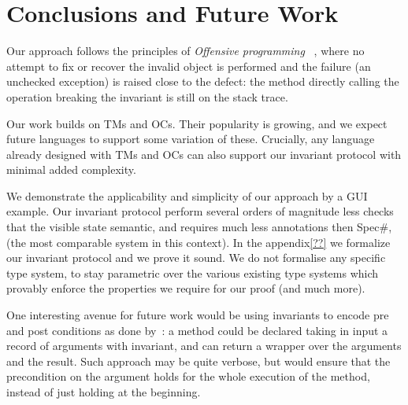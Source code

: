 \section{Conclusions and Future Work}
Our approach follows the principles of \emph{Offensive programming}
~\cite{stephens2015beginning}, where 
no attempt to fix or recover the invalid object is performed and
 the failure (an unchecked exception)
		is raised close to the defect: the method directly calling the operation breaking the invariant is still on the stack trace.


Our work builds on TMs and OCs.
Their popularity is growing, and we expect future languages to support some variation of these.
Crucially, any language already designed with TMs and OCs
can also support our invariant protocol with minimal added complexity.


We demonstrate the applicability and simplicity of our approach by a GUI example.
Our invariant protocol perform several orders of magnitude less checks that the visible state semantic,
and requires much less annotations 
then Spec\#, (the most comparable system in this context).
In the appendix\ref{??}
we formalize our invariant protocol and we prove it sound. We do not formalise any specific type system, to stay parametric over the various existing type systems which provably enforce the properties we require for our proof (and much more).


One interesting avenue for future work would be
using invariants to encode pre and post conditions
as done by~\cite{TODO:HybridTypesInvariantsandRefinementsforImperativeObjects}:%
a method could be declared taking in input a record of arguments with invariant, and can return a wrapper over the arguments and the result.
Such approach may be quite verbose, but would ensure that the precondition on the argument holds for the whole execution of the method, instead of just holding at the beginning.




